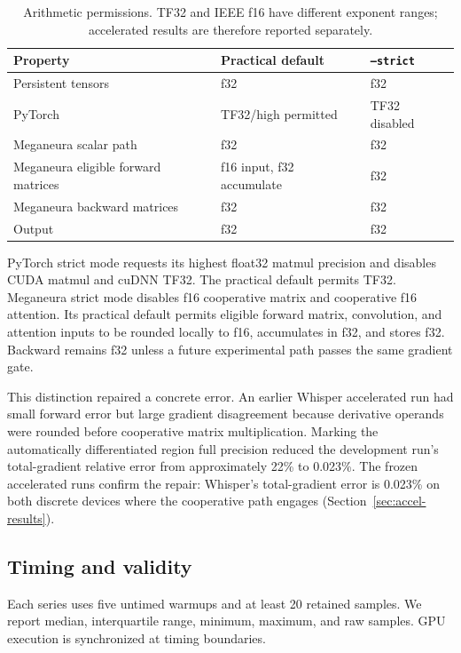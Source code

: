 \documentclass[10pt,twocolumn]{article}
\newcommand{\system}{Meganeura}
\newcommand{\code}[1]{\texttt{#1}}
\begin{document}
\begin{table}[t]
\centering
\small
\begin{tabularx}{\textwidth}{lXX}
\toprule
Property & Practical default & \code{--strict} \\
\midrule
Persistent tensors & f32 & f32 \\
PyTorch & TF32/high permitted & TF32 disabled \\
\system{} scalar path & f32 & f32 \\
\system{} eligible forward matrices & f16 input, f32 accumulate & f32 \\
\system{} backward matrices & f32 & f32 \\
Output & f32 & f32 \\
\bottomrule
\end{tabularx}
\caption{Arithmetic permissions. TF32 and IEEE f16 have different exponent
ranges; accelerated results are therefore reported separately.}
\label{tab:precision}
\end{table}

PyTorch strict mode requests its highest float32 matmul precision and disables
CUDA matmul and cuDNN TF32. The practical default permits TF32.
\system{} strict mode disables f16 cooperative matrix and cooperative f16
attention. Its practical default permits eligible forward matrix,
convolution, and attention inputs to be rounded locally to f16, accumulates in
f32, and stores f32. Backward remains f32 unless a future experimental path
passes the same gradient gate.

This distinction repaired a concrete error. An earlier Whisper accelerated
run had small forward error but large gradient disagreement because derivative
operands were rounded before cooperative matrix multiplication. Marking the
automatically differentiated region full precision reduced the development
run's total-gradient relative error from approximately 22\% to 0.023\%. The
frozen accelerated runs confirm the repair: Whisper's total-gradient error
is 0.023\% on both discrete devices where the cooperative path engages
(Section~\ref{sec:accel-results}).

\subsection{Timing and validity}

Each series uses five untimed warmups and at least 20 retained samples.
We report median, interquartile range, minimum, maximum, and raw samples.
GPU execution is synchronized at timing boundaries.
\end{document}

